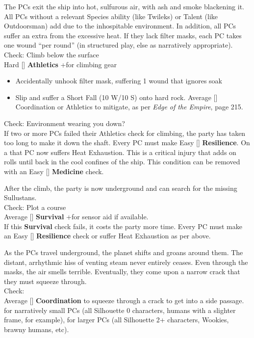 \documentclass{book}
\newcommand{\df}{\difficulty}
\begin{document}
\begin{multicols*}{2}
The PCs exit the ship into hot, sulfurous air, with ash and smoke blackening it. All PCs without a relevant Species ability (like Twileks) or Talent (like Outdoorsman) add \setback due to the inhospitable environment. In addition, all PCs suffer an extra \setback from the excessive heat.  If they lack filter masks, each PC takes one wound ``per round'' (in structured play, else as narratively appropriate).\\
Check: Climb below the surface\\
Hard [\df\df\df] \textbf{Athletics} +\boost for climbing gear
\begin{itemize}
  \item \threat\threat Accidentally unhook filter mask, suffering 1 wound that ignores soak
  \item \despair Slip and suffer a Short Fall (10 W/10 S) onto hard rock.  Average [\df\df] Coordination or Athletics to mitigate, as per \emph{Edge of the Empire}, page 215.
\end{itemize}
Check: Environment wearing you down?\\
If two or more PCs failed their Athletics check for climbing, the party has taken too long to make it down the shaft. Every PC must make Easy [\df] \textbf{Resilience}. On a \failure that PC now suffers Heat Exhaustion.  This is a critical injury that adds \setback on rolls until back in the cool confines of the ship. This condition can be removed with an Easy [\df] \textbf{Medicine} check.

After the climb, the party is now underground and can search for the missing Sullustans.\\
Check: Plot a course\\
Average [\df\df] \textbf{Survival} +\boost for sensor aid if available.\\
If this \textbf{Survival} check fails, it costs the party more time. Every PC must make an Easy [\df] \textbf{Resilience} check or suffer Heat Exhaustion as per above.

As the PCs travel underground, the planet shifts and groans around them. The distant, arrhythmic hiss of venting steam never entirely ceases. Even through the masks, the air smells terrible. Eventually, they come upon a narrow crack that they must squeeze through.\\
Check:\\
Average [\df\df] \textbf{Coordination} to squeeze through a crack to get into a side passage. \boost for narratively small PCs (all Silhouette 0 characters, humans with a slighter frame, for example), \setback for larger PCs (all Silhouette 2+ characters, Wookies, brawny humans, etc).


\end{multicols*}
\end{document}
